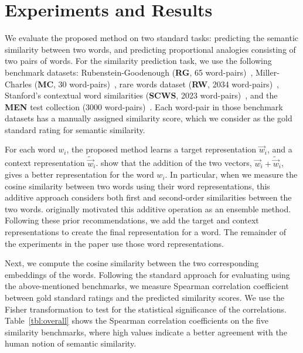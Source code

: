 \documentclass[letterpaper]{article}
\newcommand{\citep}{\cite}
\begin{document}
\section{Experiments and Results}
\label{sec:exp}


We evaluate the proposed method on two standard tasks: predicting the semantic similarity between two words,
and predicting proportional analogies consisting of two pairs of words.
For the similarity prediction task, we use the following benchmark datasets: Rubenstein-Goodenough (\textbf{RG}, 65 word-pairs)~\citep{RG},
Miller-Charles (\textbf{MC}, 30 word-pairs)~\citep{MC}, rare words dataset (\textbf{RW}, 2034 word-pairs)~\citep{Luong:CoNLL:2013},
Stanford's contextual word similarities (\textbf{SCWS}, 2023 word-pairs)~\citep{Huang:ACL:2012},
and the \textbf{MEN} test collection (3000 word-pairs)~\citep{MEN}.
Each word-pair in those benchmark datasets has a manually assigned similarity score,
which we consider as the gold standard rating for semantic similarity.

For each word $w_i$, the proposed method learns a target representation $\vec{w}_i$, and a context representation $\tilde{\vec{w}}_i$.
\cite{Levy:TACL:2015} show that the addition of the two vectors, $\vec{w}_i + \tilde{\vec{w}}_i$, gives a better
representation for the word $w_i$. In particular, when we measure the cosine similarity between two words using
their word representations, this additive approach considers both first and second-order similarities between the two words.
\cite{Pennington:EMNLP:2014} originally motivated this additive operation as an ensemble method.
Following these prior recommendations, we add the target and context representations to create the final representation for a word.
The remainder of the experiments in the paper use those word representations.

Next, we compute the cosine similarity between the two corresponding
embeddings of the words. Following the standard approach for evaluating using the above-mentioned benchmarks,
we measure Spearman correlation coefficient between gold standard ratings and the predicted similarity scores.
We use the Fisher transformation to test for the statistical significance of the correlations.
Table~\ref{tbl:overall} shows the Spearman correlation coefficients  on the five similarity benchmarks,
where high values indicate a better agreement with the human notion of semantic similarity.
\end{document}
